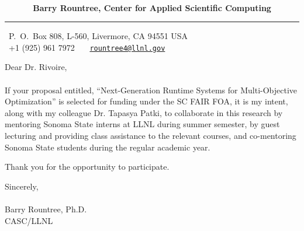 \documentclass[12pt]{article}
\begin{document}
~\vspace{-0.02in}
\begin{flushleft}
{\large\bf \ \ \ \ \ \ Barry Rountree, Center for Applied Scientific Computing}
\end{flushleft}
\medskip\hrule height 1pt
\begin{flushright}
\hfill \Letter\ P.~O.~Box 808, L-560, Livermore, CA 94551 USA\\
\hfill \Telefon\ +1 (925) 961 7972 \ \ \Email\ \href{mailto:rountree@llnl.gov}{\nolinkurl{rountree4@llnl.gov}}
\end{flushright}

\vspace{0.6in}
\noindent
\noindent


Dear Dr. Rivoire,\\~\\

If your proposal entitled, ``Next-Generation Runtime Systems for Multi-Objective Optimization''  is
selected for funding under the SC FAIR FOA, it is my intent, along with my 
colleague Dr. Tapasya Patki, to collaborate in
this research by mentoring Sonoma State interns at LLNL during summer semester,
by guest lecturing and providing class assistance to the relevant courses,
and co-mentoring Sonoma State students during the regular academic year.

Thank you for the opportunity to participate. 

\vspace{0.4in}
\noindent
Sincerely,\\
\vspace{0.25in}\\
Barry Rountree, Ph.D.\\
CASC/LLNL\\
\end{document}
